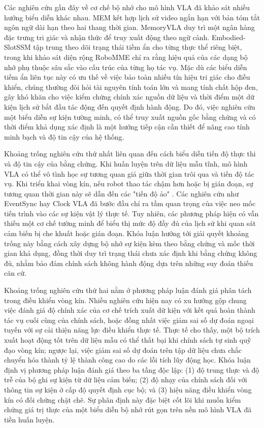 Các nghiên cứu gần đây về cơ chế bộ nhớ cho mô hình VLA đã khảo sát nhiều hướng biểu diễn khác nhau. MEM \cite{mem2026} kết hợp lịch sử video ngắn hạn với bản tóm tắt ngôn ngữ dài hạn theo hai thang thời gian. MemoryVLA \cite{memoryvla2026} duy trì một ngân hàng đặc trưng tri giác và nhận thức để truy xuất động theo ngữ cảnh. Embodied-SlotSSM \cite{liberomem2025} tập trung theo dõi trạng thái tiềm ẩn cho từng thực thể riêng biệt, trong khi khảo sát diện rộng RoboMME \cite{robomme2026} chỉ ra rằng hiệu quả của các dạng bộ nhớ phụ thuộc sâu sắc vào cấu trúc của từng họ tác vụ. Mặc dù các biểu diễn tiềm ẩn liên tục này có ưu thế về việc bảo toàn nhiều tín hiệu tri giác cho điều khiển, chúng thường đòi hỏi tài nguyên tính toán lớn và mang tính chất hộp đen, gây khó khăn cho việc kiểm chứng chính xác nguồn dữ liệu và thời điểm một dữ kiện lịch sử bắt đầu tác động đến quyết định hành động. Do đó, việc nghiên cứu một biểu diễn sự kiện tường minh, có thể truy xuất nguồn gốc bằng chứng và có thời điểm khả dụng xác định là một hướng tiếp cận cần thiết để nâng cao tính minh bạch và độ tin cậy của hệ thống.

Khoảng trống nghiên cứu thứ nhất liên quan đến cách biểu diễn tiến độ thực thi và độ tin cậy của bằng chứng. Khi huấn luyện trên dữ liệu mẫu tĩnh, mô hình VLA có thể vô tình học sự tương quan giả giữa thời gian trôi qua và tiến độ tác vụ. Khi triển khai vòng kín, nếu robot thao tác chậm hơn hoặc bị gián đoạn, sự tương quan thời gian này sẽ dẫn đến các "tiến độ ảo" \cite{clockvla2026}. Các nghiên cứu như EventSync \cite{eventsync2026} hay Clock VLA \cite{clockvla2026} đã bước đầu chỉ ra tầm quan trọng của việc neo mốc tiến trình vào các sự kiện vật lý thực tế. Tuy nhiên, các phương pháp hiện có vẫn thiếu một cơ chế tường minh để biểu thị mức độ đầy đủ của lịch sử khi quan sát cảm biến bị che khuất hoặc gián đoạn. Khóa luận hướng tới giải quyết khoảng trống này bằng cách xây dựng bộ nhớ sự kiện kèm theo bằng chứng và mốc thời gian khả dụng, đồng thời duy trì trạng thái chưa xác định khi bằng chứng không đủ, nhằm bảo đảm chính sách không hành động dựa trên những suy đoán thiếu căn cứ.

Khoảng trống nghiên cứu thứ hai nằm ở phương pháp luận đánh giá phân tách trong điều khiển vòng kín. Nhiều nghiên cứu hiện nay có xu hướng gộp chung việc đánh giá độ chính xác của cơ chế trích xuất dữ kiện với kết quả hoàn thành tác vụ cuối cùng của chính sách, hoặc đồng nhất việc giảm sai số dự đoán ngoại tuyến với sự cải thiện năng lực điều khiển thực tế. Thực tế cho thấy, một bộ trích xuất hoạt động tốt trên dữ liệu mẫu có thể thất bại khi chính sách tự sinh quỹ đạo vòng kín; ngược lại, việc giảm sai số dự đoán trên tập dữ liệu chưa chắc chuyển hóa thành tỷ lệ thành công cao do các lỗi tích lũy động học. Khóa luận định vị phương pháp luận đánh giá theo ba tầng độc lập: (1) độ trung thực và độ trễ của bộ ghi sự kiện từ dữ liệu cảm biến; (2) độ nhạy của chính sách đối với thông tin sự kiện ở cấp độ quyết định cục bộ; và (3) hiệu năng điều khiển vòng kín có đối chứng chặt chẽ. Sự phân định này đặc biệt cốt lõi khi muốn kiểm chứng giá trị thực của một biểu diễn bộ nhớ rút gọn trên nền mô hình VLA đã tiền huấn luyện.

